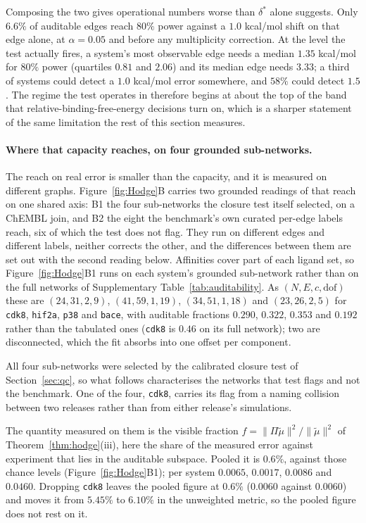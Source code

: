 Composing the two gives operational numbers worse than $\delta^\ast$ alone suggests. Only $6.6\%$ of auditable edges reach $80\%$ power against a $1.0$ kcal/mol shift on that
edge alone, at $\alpha=0.05$ and before any multiplicity correction. At the level the test actually
fires, a system's most observable edge needs a median $1.35$ kcal/mol for $80\%$ power (quartiles
$0.81$ and $2.06$) and its median edge needs $3.33$; a third of systems could detect a $1.0$
kcal/mol error somewhere, and $58\%$ could detect $1.5$. The regime the test operates in therefore
begins at about the top of the band that relative-binding-free-energy decisions turn on, which is a
sharper statement of the same limitation the rest of this section measures.

\paragraph{Where that capacity reaches, on four grounded sub-networks.} The reach on real error is
smaller than the capacity, and it is measured on different graphs. Figure~\ref{fig:Hodge}B carries two grounded readings of that reach on one shared axis:
B1 the four sub-networks the closure test itself selected, on a ChEMBL join, and B2 the eight the
benchmark's own curated per-edge labels reach, six of which the test does not flag. They run on
different edges and different labels, neither corrects the other, and the differences between them
are set out with the second reading below.
Affinities cover part of each ligand set, so Figure~\ref{fig:Hodge}B1 runs on each system's
grounded sub-network rather than on the full networks of Supplementary
Table~\ref{tab:auditability}. As
$(N,E,c,\mathrm{dof})$ these are
$(24,31,2,9)$, $(41,59,1,19)$, $(34,51,1,18)$ and $(23,26,2,5)$ for \texttt{cdk8}, \texttt{hif2a},
\texttt{p38} and \texttt{bace}, with auditable fractions $0.290$, $0.322$, $0.353$ and $0.192$
rather than the tabulated ones (\texttt{cdk8} is $0.46$ on its full network); two are disconnected,
which the fit absorbs into one offset per component.

All four sub-networks were selected by the calibrated closure test of Section~\ref{sec:qc}, so
what follows characterises the networks that test flags and not the benchmark. One of the four,
\texttt{cdk8}, carries its flag from a naming collision between two releases rather than from
either release's simulations.

The quantity measured on them is the visible fraction $f=\|\Pi\tilde\mu\|^2/\|\tilde\mu\|^2$ of
Theorem~\ref{thm:hodge}(iii), here the share of the measured error against experiment that lies in
the auditable subspace. Pooled it is $0.6\%$, against those chance levels
(Figure~\ref{fig:Hodge}B1); per system $0.0065$, $0.0017$, $0.0086$ and $0.0460$. Dropping
\texttt{cdk8} leaves the pooled figure at $0.6\%$ ($0.0060$ against $0.0060$) and moves it from
$5.45\%$ to $6.10\%$ in the unweighted metric, so the pooled figure does not rest on it.

